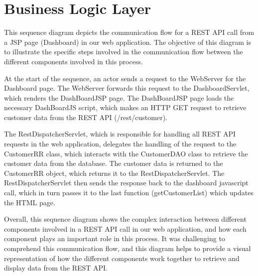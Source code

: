 \section{Business Logic Layer}


This sequence diagram depicts the communication flow for a REST API call from a JSP page (Dashboard) in our web application. The objective of this diagram is to illustrate the specific steps involved in the communication flow between the different components involved in this process.

\vspace{10pt} 

At the start of the sequence, an actor sends a request to the WebServer for the Dashboard page. The WebServer forwards this request to the DashboardServlet, which renders the DashBoardJSP page. The DashBoardJSP page loads the necessary DashBoardJS script, which makes an HTTP GET request to retrieve customer data from the REST API (/rest/customer).

\vspace{10pt} 

The RestDispatcherServlet, which is responsible for handling all REST API requests in the web application, delegates the handling of the request to the CustomerRR class, which interacts with the CustomerDAO class to retrieve the customer data from the database. The customer data is returned to the CustomerRR object, which returns it to the RestDispatcherServlet. The RestDispatcherServlet then sends the response back to the dashboard javascript call, which in turn passes it to the last function (getCustomerList) which updates the HTML page.  

\vspace{10pt} 

Overall, this sequence diagram shows the complex interaction between different components involved in a REST API call in our web application, and how each component plays an important role in this process. It was challenging to comprehend this communication flow, and this diagram helps to provide a visual representation of how the different components work together to retrieve and display data from the REST API.






